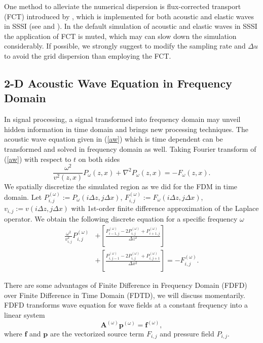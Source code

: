 \documentclass[11pt]{article}
\newcommand{\bA}{\boldsymbol{A}}
\newcommand{\bff}{\boldsymbol{f}}
\newcommand{\bp}{\boldsymbol{p}}
\theoremstyle{plain}
\theoremstyle{definition}
\theoremstyle{remark}
\numberwithin{equation}{section}
\begin{document}
One method to alleviate the numerical dispersion is flux-corrected transport (FCT) introduced by \cite{FeiLar1995}, 
which is implemented for both acoustic and elastic waves in SSSI (see  and ).
In the default simulation of acoustic and elastic waves in SSSI the application of FCT is muted, which may can slow down the 
simulation considerably. If possible, we strongly suggest to modify the sampling rate and $\Delta u$ 
to avoid the grid dispersion than employing the FCT.  


\subsection{2-D Acoustic Wave Equation in Frequency Domain}
In signal processing, a signal transformed into frequency domain may unveil hidden information in time domain and brings new processing
techniques. The acoustic wave equation given in (\ref{aw}) which is time dependent can be transformed and solved in frequency domain as well. 
Taking Fourier transform of (\ref{aw}) with respect to $t$ on both sides
  \begin{equation}
  \frac{\omega^2}{v^2(z, x)}P_{\omega}(z, x) + \nabla^2 P_{\omega}(z, x) =- F_{\omega}(z, x).
  \end{equation}
  We spatially discretize the simulated region as we did for the FDM in time domain.  
  Let $P_{i,j}^{(\omega)} := P_{\omega}(i\Delta z, j\Delta x)$, $F_{i,j}^{(\omega)} := 
  F_{\omega}(i\Delta z, j\Delta x)$, $v_{i,j} := v(i\Delta z, j\Delta x)$  with 1st-order finite difference approximation of the Laplace operator.
  We obtain the following discrete equation for a specific frequency $\omega$
  \begin{equation}
  \begin{aligned}
  \frac{\omega^2}{v_{i,j}^2} P_{i,j}^{(\omega)} &+\left[ \frac{P_{i-1,j}^{(\omega)} - 2P_{i,j}^{(\omega)} + P_{i+1,j}^{(\omega)}}{\Delta z^2} \right] \\&+\left[ \frac{P_{i,j-1}^{(\omega)} - 2P_{i,j}^{(\omega)} + P_{i,j+1}^{(\omega)}}{\Delta x^2} \right] =- F_{i,j}^{(\omega)}.
  \end{aligned}
  \end{equation}
  
There are some advantages of Finite Difference in Frequency Domain (FDFD) over Finite Difference in Time Domain (FDTD), we will discuss momentarily. FDFD transforms wave equation for wave fields at a constant frequency into a linear system 
\begin{equation}\label{awfreq}
\bA^{(\omega)}\bp^{(\omega)} = \bff^{(\omega)},
\end{equation}
where $\bff$ and $\bp$ are the vectorized source term $F_{i,j}$ and pressure field $P_{i,j}$.
\end{document}

